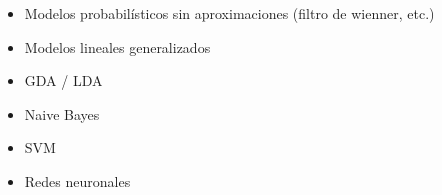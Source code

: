 
\begin{itemize}
\item Modelos probabilísticos sin aproximaciones (filtro de wienner, etc.)
\item Modelos lineales generalizados
\item GDA / LDA
\item Naive Bayes
\item SVM
\item Redes neuronales
\end{itemize}